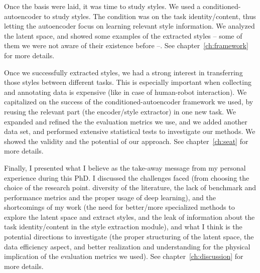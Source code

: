   \par Once the basis were laid, it was time to study styles. We used a conditioned-autoencoder to study styles. The condition was on the task identity/content, thus letting the autoencoder focus on learning relevant style information. We analyzed the latent space, and showed some examples of the extracted styles -- some of them we were not aware of their existence before --. See chapter~\ref{ch:framework} for more details.

  \par Once we successfully extracted styles, we had a strong interest in transferring those styles between different tasks. This is especially important when collecting and annotating data is expensive (like in case of human-robot interaction). We capitalized on the success of the conditioned-autoencoder framework we used, by reusing the relevant part (the encoder/style extractor) in one new task. We expanded and refined the the evaluation metrics we use, and we added another data set, and performed extensive statistical tests to investigate our methods. We showed the validity and the potential of our approach. See chapter~\ref{ch:seat} for more details.

  \par Finally, I presented what I believe as the take-away message from my personal experience during this PhD. I discussed the challenges faced (from choosing the choice of the research point. diversity of the literature, the lack of benchmark and performance metrics and the proper usage of deep learning), and the shortcomings of my work (the need for better/more specialized methods to explore the latent space and extract styles, and the leak of information about the task identity/content in the style extraction module), and what I think is the potential directions to investigate (the proper structuring of the latent space, the data efficiency aspect, and better realization and understanding for the physical implication of the evaluation metrics we used). See chapter~\ref{ch:discussion} for more details.

